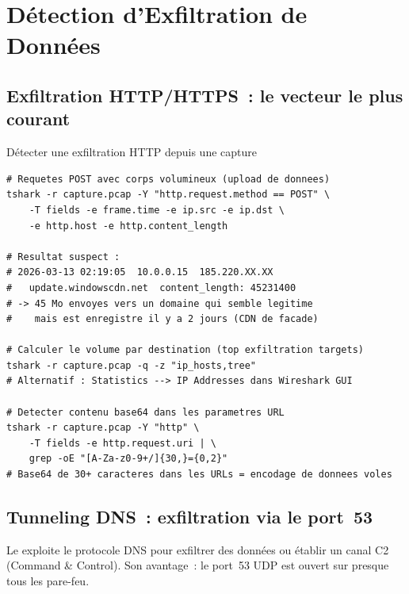 \section{Détection d'Exfiltration de Données}
\label{sec:exfiltration}

\subsection{Exfiltration HTTP/HTTPS~: le vecteur le plus courant}

\begin{boxoutils}{Détecter une exfiltration HTTP depuis une capture}
\begin{lstlisting}[language=bash_forensique]
# Requetes POST avec corps volumineux (upload de donnees)
tshark -r capture.pcap -Y "http.request.method == POST" \
    -T fields -e frame.time -e ip.src -e ip.dst \
    -e http.host -e http.content_length

# Resultat suspect :
# 2026-03-13 02:19:05  10.0.0.15  185.220.XX.XX
#   update.windowscdn.net  content_length: 45231400
# -> 45 Mo envoyes vers un domaine qui semble legitime
#    mais est enregistre il y a 2 jours (CDN de facade)

# Calculer le volume par destination (top exfiltration targets)
tshark -r capture.pcap -q -z "ip_hosts,tree"
# Alternatif : Statistics --> IP Addresses dans Wireshark GUI

# Detecter contenu base64 dans les parametres URL
tshark -r capture.pcap -Y "http" \
    -T fields -e http.request.uri | \
    grep -oE "[A-Za-z0-9+/]{30,}={0,2}"
# Base64 de 30+ caracteres dans les URLs = encodage de donnees voles
\end{lstlisting}
\end{boxoutils}

\subsection{Tunneling DNS~: exfiltration via le port~53}

Le  exploite le protocole
DNS pour exfiltrer des données ou établir un canal C2 (Command \& Control).
Son avantage~: le port~53 UDP est ouvert sur presque tous les pare-feu.

